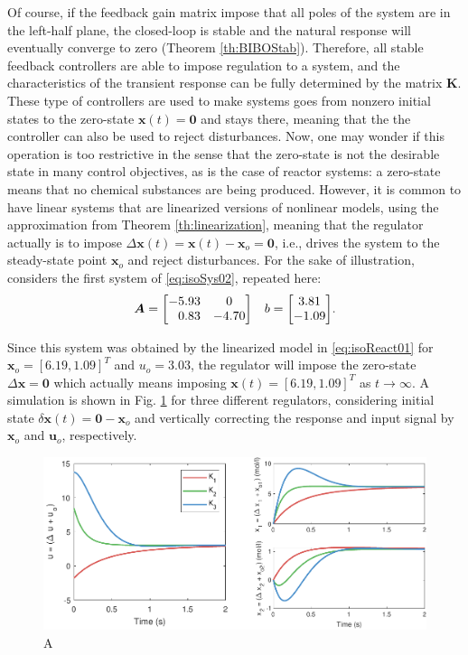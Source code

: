 \documentclass[a4paper,11pt]{book}
\numberwithin{figure}{chapter}
\numberwithin{equation}{chapter}
\numberwithin{table}{chapter}
\theoremstyle{definition}
\begin{document}
Of course, if the feedback gain matrix impose that all poles of the system are in the left-half plane, the closed-loop is stable and the natural response will eventually converge to zero (Theorem \ref{th:BIBOStab}). Therefore, all stable feedback controllers are able to impose regulation to a system, and the characteristics of the transient response can be fully determined by the matrix $\bm{K}$. These type of controllers are used to make systems goes from nonzero initial states to the zero-state $\bm{x}(t) = \bm{0}$ and stays there, meaning that the the controller can also be used to reject disturbances. Now, one may wonder if this operation is too restrictive in the sense that the zero-state is not the desirable state in many control objectives, as is the case of reactor systems: a zero-state means that no chemical substances are being produced. However, it is common to have linear systems that are   linearized versions of nonlinear models, using the approximation from Theorem \ref{th:linearization}, meaning that the regulator actually is to impose $\Delta \bm{x}(t) = \bm{x}(t) - \bm{x}_o = \bm{0}$, i.e., drives the system to the steady-state point $\bm{x}_o$ and reject disturbances. For the sake of illustration, considers the first system of \eqref{eq:isoSys02}, repeated here:
\begin{equation}
\begin{matrix}
    \bm{A} = \begin{bmatrix} 
        -5.93  &      0 \\
        \hfill 0.83   &  -4.70 
    \end{bmatrix} & b = \begin{bmatrix} 3.81 \\ -1.09 \end{bmatrix}
\end{matrix}    
.\end{equation}


Since this system was obtained by the linearized model in \eqref{eq:isoReact01} for $\bm{x}_o = [6.19, 1.09]^T$ and $u_o = 3.03$, the regulator will impose the zero-state $\Delta \bm{x} = \bm{0}$ which actually means imposing $\bm{x}(t) = [6.19, 1.09]^T$ as $t \to \infty$. A simulation is shown in Fig. \ref{fig:regulator01} for three different regulators, considering initial state $\delta \bm{x}(t) = \bm{0} - \bm{x}_o$ and vertically correcting the response and input signal by $\bm{x}_o$ and $\bm{u}_o$, respectively.

\begin{figure}
    \centering
    \includegraphics[width=\textwidth]{chapter3/report_ch3_1}
    \caption{A}
    \label{fig:regulator01}
\end{figure}
\end{document}
